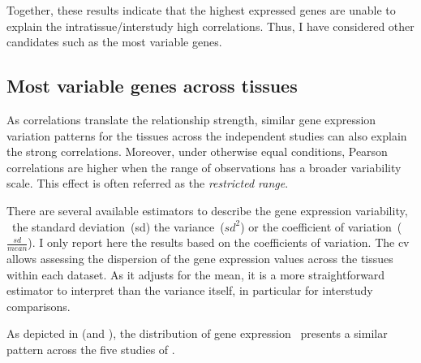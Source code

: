 Together, these results indicate
that the highest expressed genes are unable to explain
the intratissue/interstudy high correlations.
Thus, I have considered other candidates
such as the most variable genes.\mybr\


\subsection{Most variable genes across tissues}
As correlations translate the relationship strength,
similar gene expression variation patterns for the tissues
across the independent studies can also explain the strong correlations.
Moreover, under otherwise equal conditions,
Pearson correlations are higher
when the range of observations has a broader variability scale.
This effect is often referred as
the \emph{restricted range}.~\mybr\

There are several available estimators to describe the gene expression variability,
\eg\ the standard deviation~(sd) the variance~($sd^2$) or the coefficient of
variation~($\frac{sd}{mean}$).
I only report here the results based on the coefficients of variation.
The \gls{cv} allows assessing
the dispersion of the gene expression values
across the tissues within each dataset.
As it adjusts for the mean,
it is a more straightforward estimator to interpret than
the variance itself,
in particular for interstudy comparisons.\mybr\

\begin{comment}
Visualising the \gls{cv} distribution of
gene expression for the working set \setOne\ (see \Cref{fig:HistCV4T})
allows determining whether they are similar across the five transcriptomic studies
or that inferring conclusions requires more cautions.\mybr\
\end{comment}
As depicted in  (and ),
the distribution of gene expression \cvs\ presents a similar pattern
across the five studies of \setOne.\mybr\

